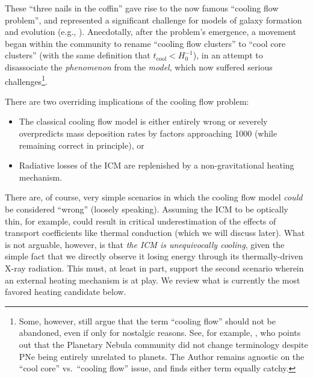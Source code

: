 These ``three nails in the coffin'' gave rise to the now famous ``cooling flow problem'',
and represented a significant challenge for models of galaxy formation and evolution (e.g., \citealt{silk77,rees77}). 
Anecdotally, after the problem's emergence, a movement began within the community to rename ``cooling flow clusters'' 
to ``cool core clusters'' (with the same definition that $t_\mathrm{cool} < H_0^{-1}$), in an attempt to disassociate the {\it phenomenon} from the {\it model}, which
now suffered serious challenges\footnote{Some, however, still argue that the term ``cooling flow'' should not be abandoned, even if only for nostalgic reasons. See, for example, \citealt{soker10}, who points out that the Planetary Nebula community did not change terminology despite PNe being entirely unrelated to planets. The Author remains agnostic on the ``cool core'' vs.~``cooling flow'' issue, and finds either term equally catchy. }. 



There are two overriding implications of the cooling flow problem: 
\begin{itemize}

\item  The classical cooling flow model is either entirely wrong or severely 
overpredicts mass deposition rates by factors approaching 1000 (while remaining correct in principle), or

\item  Radiative losses of the ICM are replenished by a non-gravitational heating mechanism.

\end{itemize}


There are, of course, very simple scenarios in which the cooling flow model {\it could} be considered ``wrong'' (loosely speaking). 
Assuming the ICM to be optically thin, for example, could result in critical underestimation of the effects of transport 
coefficients like thermal conduction (which we will discuss later). What is not arguable, however, is that 
{\it the ICM is unequivocally cooling}, given the simple fact that we directly observe it losing energy through its thermally-driven X-ray radiation. This must, at least in part, support the second scenario wherein an external heating mechanism is at play. We review what is currently 
the most favored heating candidate below.  



















